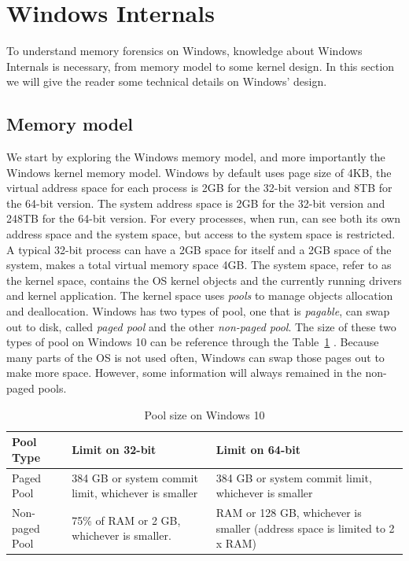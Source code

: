 \section[Windows Internals]{Windows Internals}

To understand memory forensics on Windows, knowledge about Windows Internals is necessary, from memory model to some kernel design. In this section we will give the reader some technical details on Windows' design.

\subsection[Memory model]{Memory model}

We start by exploring the Windows memory model, and more importantly the Windows kernel memory model. Windows by default uses page size of 4KB, the virtual address space for each process is 2GB for the 32-bit version and 8TB for the 64-bit version. The system address space is 2GB for the 32-bit version and 248TB for the 64-bit version. For every processes, when run, can see both its own address space and the system space, but access to the system space is restricted. A typical 32-bit process can have a 2GB space for itself and a 2GB space of the system, makes a total virtual memory space 4GB. The system space, refer to as the kernel space, contains the OS kernel objects and the currently running drivers and kernel application. The kernel space uses \textit{pools} to manage objects allocation and deallocation. Windows has two types of pool, one that is \textit{pagable}, can swap out to disk, called \textit{paged pool} and the other \textit{non-paged pool}. The size of these two types of pool on Windows 10 can be reference through the Table~\ref{tab:poolsize} \cite{memorylimit}. Because many parts of the OS is not used often, Windows can swap those pages out to make more space. However, some information will always remained in the non-paged pools.

\begin{center}
\begin{table}[h]
\begin{tabular}{l p{5cm} p{5cm} }
Pool Type & Limit on 32-bit & Limit on 64-bit \\ \hline
Paged Pool & 384 GB or system commit limit, whichever is smaller & 384 GB or system commit limit, whichever is smaller \\
Non-paged Pool & 75\% of RAM or 2 GB, whichever is smaller. & RAM or 128 GB, whichever is smaller (address space is limited to 2 x RAM) \\
\end{tabular}
\caption{Pool size on Windows 10}
\label{tab:poolsize}
\end{table}
\end{center}

